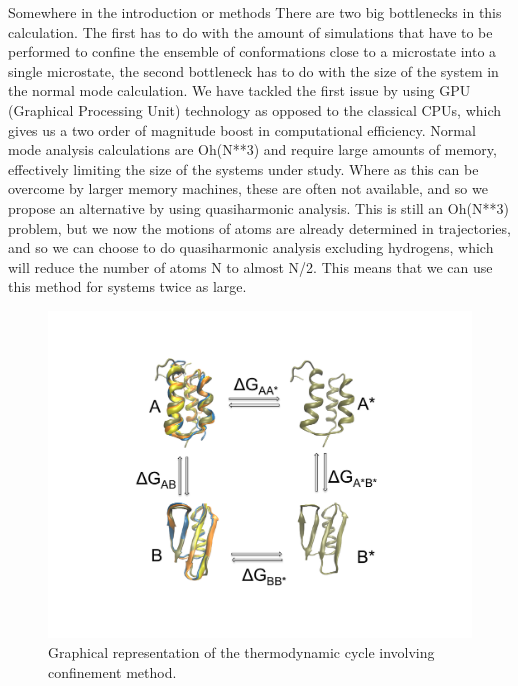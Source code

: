 \documentclass[12pt]{article}
\newcommand{\Alberto}[1]{\color{ForestGreen}#1\normalcolor }
\begin{document}
\Alberto{Somewhere in the introduction or methods}
There are two big bottlenecks in this calculation. The first has to do with the amount of
simulations that have to be performed to confine the ensemble of conformations close to a microstate
into a single microstate, the second bottleneck has to do with the size of the system in the normal
mode calculation. We have tackled the first issue by using GPU (Graphical Processing Unit) technology as opposed to the classical
CPUs, which gives us a two order of magnitude boost in computational efficiency. Normal mode
analysis calculations are Oh(N**3) and require large amounts of memory, effectively limiting the
size of the systems under study. Where as this can be overcome by larger memory machines, these are
often not available, and so we propose an alternative by using quasiharmonic analysis. This is still
an Oh(N**3) problem, but we now the motions of atoms are already determined in trajectories, and so
we can choose to do quasiharmonic analysis excluding hydrogens, which will reduce the number of
atoms N to almost N/2. This means that we can use this method for systems twice as large.


\begin{figure}
\begin{center}
\includegraphics[width=3.5 in,height=3.5 in]{method.pdf}
\end{center}
\caption{Graphical representation of the thermodynamic cycle involving confinement method.}
\label{fig:method}
\end{figure}
\end{document}
